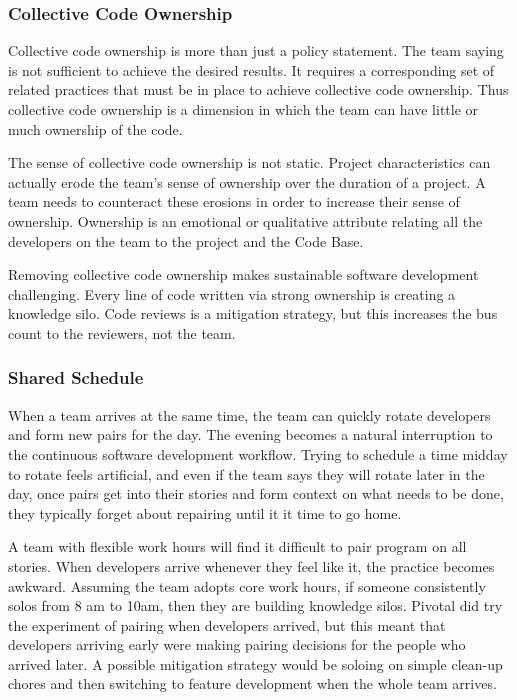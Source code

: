 \begin{table}[]
\subsubsection{Collective Code Ownership}
Collective code ownership is more than just a policy statement. The team saying  is not sufficient to achieve the desired results. It requires a corresponding set of related practices that must be in place to achieve collective code ownership. Thus collective code ownership is a dimension in which the team can have little or much ownership of the code. 

The sense of collective code ownership is not static. Project characteristics can actually erode the team's sense of ownership over the duration of a project. A team needs to counteract these erosions in order to increase their sense of ownership. Ownership is an emotional or qualitative attribute relating all the developers on the team to the project and the Code Base.


Removing collective code ownership makes sustainable software development challenging. Every line of code written via strong ownership is creating a knowledge silo. Code reviews is a mitigation strategy, but this increases the bus count to the reviewers, not the team. 

\subsubsection{Shared Schedule}
When a team arrives at the same time, the team can quickly rotate developers and form new pairs for the day. The evening becomes a natural interruption to the continuous software development workflow. Trying to schedule a time midday to rotate feels artificial, and even if the team says they will rotate later in the day, once pairs get into their stories and form context on what needs to be done, they typically forget about repairing until it it time to go home.

A team with flexible work hours will find it difficult to pair program on all stories. When developers arrive whenever they feel like it, the  practice becomes awkward. Assuming the team adopts core work hours, if someone consistently solos from 8 am to 10am, then they are building knowledge silos. Pivotal did try the experiment of pairing when developers arrived, but this meant that developers arriving early were making pairing decisions for the people who arrived later. A possible mitigation strategy would be soloing on simple clean-up chores and then switching to feature development when the whole team arrives. 


\end{table}
